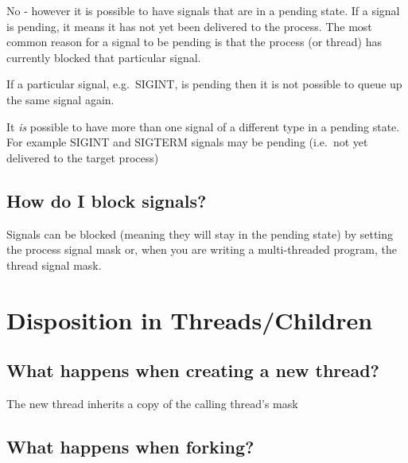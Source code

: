 No - however it is possible to have signals that are in a pending state.
If a signal is pending, it means it has not yet been delivered to the
process. The most common reason for a signal to be pending is that the
process (or thread) has currently blocked that particular signal.

If a particular signal, e.g.~SIGINT, is pending then it is not possible
to queue up the same signal again.

It \emph{is} possible to have more than one signal of a different type
in a pending state. For example SIGINT and SIGTERM signals may be
pending (i.e.~not yet delivered to the target process)

\subsection{How do I block signals?}\label{how-do-i-block-signals}

Signals can be blocked (meaning they will stay in the pending state) by
setting the process signal mask or, when you are writing a
multi-threaded program, the thread signal mask.

\section{Disposition in
Threads/Children}\label{disposition-in-threadschildren}

\subsection{What happens when creating a new
thread?}\label{what-happens-when-creating-a-new-thread}

The new thread inherits a copy of the calling thread's mask

\begin{Shaded}
\begin{Highlighting}[]
\end{Highlighting}
\end{Shaded}

\subsection{What happens when forking?}\label{what-happens-when-forking}

